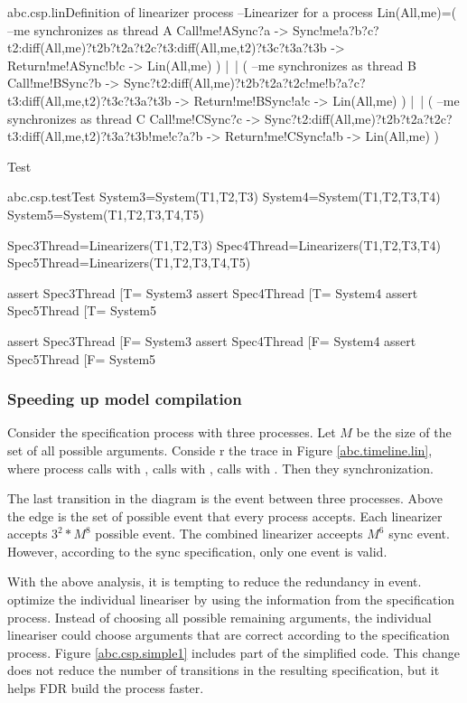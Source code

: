 \documentclass{article}
\begin{document}
\begin{cspinline}{abc.csp.lin}{Definition of linearizer process}
--Linearizer for a process
Lin(All,me)=(
  --me synchronizes as thread A
  Call!me!ASync?a ->
  Sync!me!a?b?c?t2:diff(All,{me})?t2b?t2a?t2c?t3:diff(All,{me,t2})?t3c?t3a?t3b ->
  Return!me!ASync!b!c ->
  Lin(All,me)
) |~| (
  --me synchronizes as thread B
  Call!me!BSync?b ->
  Sync?t2:diff(All,{me})?t2b?t2a?t2c!me!b?a?c?t3:diff(All,{me,t2})?t3c?t3a?t3b ->
  Return!me!BSync!a!c ->
  Lin(All,me)
) |~| (
  --me synchronizes as thread C
  Call!me!CSync?c ->
  Sync?t2:diff(All,{me})?t2b?t2a?t2c?t3:diff(All,{me,t2})?t3a?t3b!me!c?a?b ->
  Return!me!CSync!a!b ->
  Lin(All,me)
)
\end{cspinline}

Test
\begin{cspinline}{abc.csp.test}{Test}
System3=System({T1,T2,T3})
System4=System({T1,T2,T3,T4})
System5=System({T1,T2,T3,T4,T5})

Spec3Thread=Linearizers({T1,T2,T3})
Spec4Thread=Linearizers({T1,T2,T3,T4})
Spec5Thread=Linearizers({T1,T2,T3,T4,T5})

assert Spec3Thread [T= System3
assert Spec4Thread [T= System4
assert Spec5Thread [T= System5

assert Spec3Thread [F= System3
assert Spec4Thread [F= System4
assert Spec5Thread [F= System5
\end{cspinline}
\subsubsection{Speeding up model compilation}
Consider the specification process with three processes. Let $M$ be the size of the set of all possible arguments. Conside r the trace in Figure \ref{abc.timeline.lin}, where process  calls  with ,  calls  with ,  calls  with . Then they synchronization.


The last transition in the diagram is the  event between three processes. Above the edge is the set of possible  event that every process accepts. Each linearizer accepts $3^2*M^8$ possible  event. The combined linearizer acceepts $M^6$ sync event. However, according to the sync specification, only one  event is valid. 
    
With the above analysis, it is tempting to reduce the redundancy in  event. optimize the individual lineariser by using the information from the specification process. Instead of choosing all possible remaining arguments, the individual lineariser could choose arguments that are correct according to the specification process. Figure \ref{abc.csp.simple1} includes part of the simplified code. This change does not reduce the number of transitions in the resulting specification, but it helps FDR build the process faster.
\end{document}

